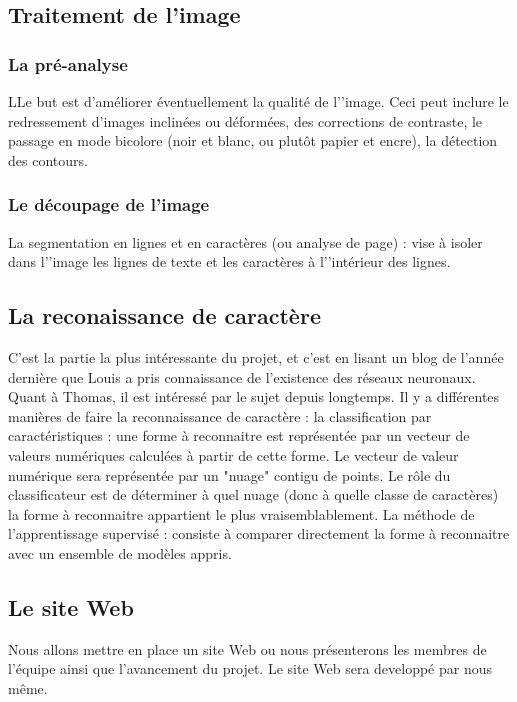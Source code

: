 \documentclass{article}
\begin{document}
            \subsection{Traitement de l'image}
                          \subsubsection{La pré-analyse}
LLe but est d’améliorer éventuellement la qualité de l'’image. Ceci peut inclure le
redressement d’images inclinées ou déformées, des corrections de contraste, le passage
en mode bicolore (noir et blanc, ou plutôt papier et encre), la détection des contours.


                          \subsubsection{Le découpage de l'image}
La segmentation en lignes et en caractères (ou analyse de page) : vise à isoler dans
l'’image les lignes de texte et les caractères à l'’intérieur des lignes.


            \subsection{La reconaissance de caractère}
C’est la partie la plus intéressante du projet, et c’est en lisant un blog de l’année
dernière que Louis a pris connaissance de l’existence des réseaux neuronaux. Quant à
Thomas, il est intéressé par le sujet depuis longtemps. Il y a différentes manières de
faire la reconnaissance de caractère : la classification par caractéristiques : une forme à
reconnaitre est représentée par un vecteur de valeurs numériques calculées à partir de
cette forme. Le vecteur de valeur numérique sera représentée par un "nuage" contigu
de points. Le rôle du classificateur est de déterminer à quel nuage (donc à quelle classe
de caractères) la forme à reconnaitre appartient le plus vraisemblablement.
La méthode de l’apprentissage supervisé : consiste à comparer directement la forme
à reconnaitre avec un ensemble de modèles appris.

            \subsection{Le site Web}
Nous allons mettre en place un site Web ou nous présenterons les membres de
l’équipe ainsi que l’avancement du projet. Le site Web sera developpé par nous même.
\end{document}
